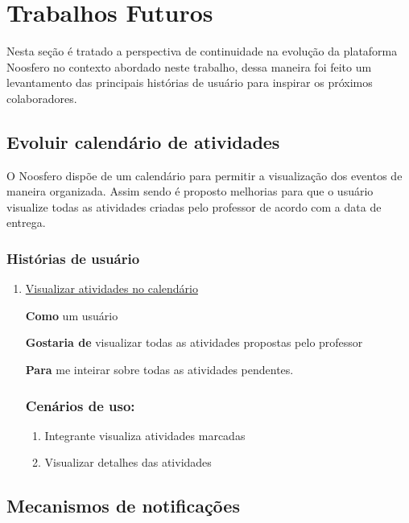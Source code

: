 \section{Trabalhos Futuros}

Nesta seção é tratado a perspectiva de continuidade na evolução da plataforma Noosfero no contexto abordado neste trabalho, dessa maneira foi feito um levantamento das principais histórias de usuário para inspirar os próximos colaboradores.

\subsection{Evoluir calendário de atividades}

O Noosfero dispõe de um calendário para permitir a visualização dos eventos de maneira organizada. Assim sendo é proposto melhorias para que o usuário visualize todas as atividades criadas pelo professor de acordo com a data de entrega.

\subsubsection*{Histórias de usuário}
\begin{enumerate}
\item \underline{Visualizar atividades no calendário}

\textbf{Como} um usuário

\textbf{Gostaria de} visualizar todas as atividades propostas pelo professor

\textbf{Para} me inteirar sobre todas as atividades pendentes.

\subsubsection*{Cenários de uso:}
  \begin{enumerate}
  \item Integrante visualiza atividades marcadas
  \item Visualizar detalhes das atividades
  \end{enumerate}
\end{enumerate}

\subsection{Mecanismos de notificações}

